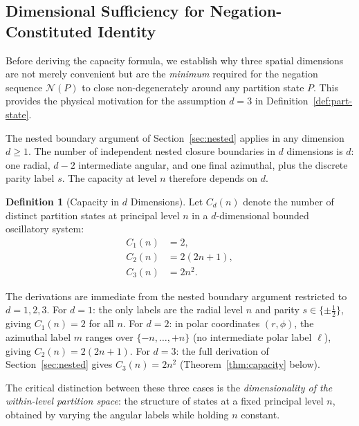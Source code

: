 \documentclass[twocolumn,10pt,a4paper]{article}
\theoremstyle{thmstyle}
\theoremstyle{definition}
\newtheorem{definition}[theorem]{Definition}
\theoremstyle{remark}
\begin{document}
\subsection{Dimensional Sufficiency for Negation-Constituted Identity}
\label{sec:dim-sufficiency}

Before deriving the capacity formula, we establish why three spatial dimensions are not merely convenient but are the \emph{minimum} required for the negation sequence $\mathcal{N}(P)$ to close non-degenerately around any partition state $P$. This provides the physical motivation for the assumption $d = 3$ in Definition~\ref{def:part-state}.

The nested boundary argument of Section~\ref{sec:nested} applies in any dimension $d \geq 1$. The number of independent nested closure boundaries in $d$ dimensions is $d$: one radial, $d-2$ intermediate angular, and one final azimuthal, plus the discrete parity label $s$. The capacity at level $n$ therefore depends on $d$.

\begin{definition}[Capacity in $d$ Dimensions]
\label{def:cap-d}
Let $C_d(n)$ denote the number of distinct partition states at principal level $n$ in a $d$-dimensional bounded oscillatory system:
\begin{align}
    C_1(n) &= 2, \label{eq:c1} \\
    C_2(n) &= 2(2n+1), \label{eq:c2} \\
    C_3(n) &= 2n^2. \label{eq:c3}
\end{align}
\end{definition}

The derivations are immediate from the nested boundary argument restricted to $d = 1, 2, 3$. For $d = 1$: the only labels are the radial level $n$ and parity $s \in \{\pm\tfrac{1}{2}\}$, giving $C_1(n) = 2$ for all $n$. For $d = 2$: in polar coordinates $(r, \phi)$, the azimuthal label $m$ ranges over $\{-n, \ldots, +n\}$ (no intermediate polar label $\ell$), giving $C_2(n) = 2(2n+1)$. For $d = 3$: the full derivation of Section~\ref{sec:nested} gives $C_3(n) = 2n^2$ (Theorem~\ref{thm:capacity} below).

The critical distinction between these three cases is the \emph{dimensionality of the within-level partition space}: the structure of states at a fixed principal level $n$, obtained by varying the angular labels while holding $n$ constant.
\end{document}
